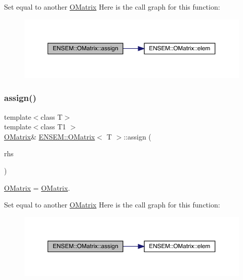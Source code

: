 Set equal to another \mbox{\hyperlink{classENSEM_1_1OMatrix}{O\+Matrix}} Here is the call graph for this function\+:
\nopagebreak
\begin{figure}[H]
\begin{center}
\leavevmode
\includegraphics[width=350pt]{dd/d80/classENSEM_1_1OMatrix_a37ed216c9ecfe42f7a357573699b3bfc_cgraph}
\end{center}
\end{figure}
\mbox{\label{classENSEM_1_1OMatrix_a37ed216c9ecfe42f7a357573699b3bfc}} 
\subsubsection{\texorpdfstring{assign()}{assign()}\hspace{0.1cm}{\footnotesize\ttfamily [8/9]}}
{\footnotesize\ttfamily template$<$class T$>$ \\
template$<$class T1 $>$ \\
\mbox{\hyperlink{classENSEM_1_1OMatrix}{O\+Matrix}}\& \mbox{\hyperlink{classENSEM_1_1OMatrix}{E\+N\+S\+E\+M\+::\+O\+Matrix}}$<$ T $>$\+::assign (\begin{DoxyParamCaption}\item[{const \mbox{\hyperlink{classENSEM_1_1OMatrix}{O\+Matrix}}$<$ T1 $>$ \&}]{rhs }\end{DoxyParamCaption})\hspace{0.3cm}{\ttfamily [inline]}}



\mbox{\hyperlink{classENSEM_1_1OMatrix}{O\+Matrix}} = \mbox{\hyperlink{classENSEM_1_1OMatrix}{O\+Matrix}}. 

Set equal to another \mbox{\hyperlink{classENSEM_1_1OMatrix}{O\+Matrix}} Here is the call graph for this function\+:
\nopagebreak
\begin{figure}[H]
\begin{center}
\leavevmode
\includegraphics[width=350pt]{dd/d80/classENSEM_1_1OMatrix_a37ed216c9ecfe42f7a357573699b3bfc_cgraph}
\end{center}
\end{figure}
\mbox{\label{classENSEM_1_1OMatrix_a37ed216c9ecfe42f7a357573699b3bfc}} 
